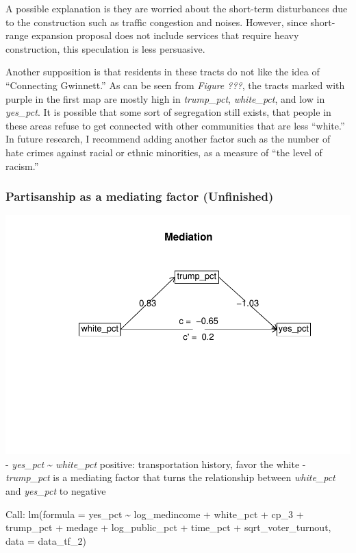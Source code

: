 \documentclass[
]{article}
\begin{document}
A possible explanation is they are worried about the short-term
disturbances due to the construction such as traffic congestion and
noises. However, since short-range expansion proposal does not include
services that require heavy construction, this speculation is less
persuasive.

Another supposition is that residents in these tracts do not like the
idea of ``Connecting Gwinnett.'' As can be seen from \emph{Figure ???},
the tracts marked with purple in the first map are mostly high in
\emph{trump\_pct}, \emph{white\_pct}, and low in \emph{yes\_pct}. It is
possible that some sort of segregation still exists, that people in
these areas refuse to get connected with other communities that are less
``white.'' In future research, I recommend adding another factor such as
the number of hate crimes against racial or ethnic minorities, as a
measure of ``the level of racism.''

\hypertarget{partisanship-as-a-mediating-factor-unfinished}{%
\subsubsection{Partisanship as a mediating factor
(Unfinished)}\label{partisanship-as-a-mediating-factor-unfinished}}

\includegraphics{Zhong_paper_files/figure-latex/unnamed-chunk-4-1.pdf} -
\emph{yes\_pct} \textasciitilde{} \emph{white\_pct} positive:
transportation history, favor the white - \emph{trump\_pct} is a
mediating factor that turns the relationship between \emph{white\_pct}
and \emph{yes\_pct} to negative

Call: lm(formula = yes\_pct \textasciitilde{} log\_medincome +
white\_pct + cp\_3 + trump\_pct + medage + log\_public\_pct + time\_pct
+ sqrt\_voter\_turnout, data = data\_tf\_2)
\end{document}
